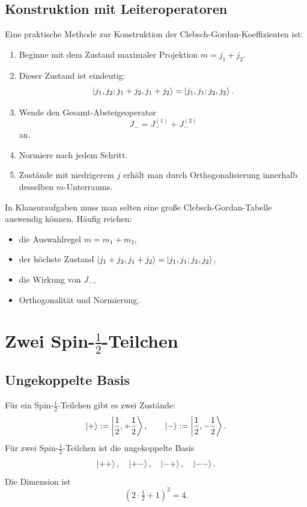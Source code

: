 \subsection{Konstruktion mit Leiteroperatoren}

Eine praktische Methode zur Konstruktion der Clebsch-Gordan-Koeffizienten ist:
\begin{enumerate}
    \item Beginne mit dem Zustand maximaler Projektion \(m=j_1+j_2\).
    \item Dieser Zustand ist eindeutig:
    \[
        \left|j_1,j_2;j_1+j_2,j_1+j_2\right\rangle
        =\left|j_1,j_1;j_2,j_2\right\rangle.
    \]
    \item Wende den Gesamt-Absteigeoperator
    \[
        J_- = J^{(1)}_-+J^{(2)}_-
    \]
    an.
    \item Normiere nach jedem Schritt.
    \item Zustände mit niedrigerem \(j\) erhält man durch Orthogonalisierung innerhalb desselben \(m\)-Unterraums.
\end{enumerate}

\begin{examtipbox}
In Klausuraufgaben muss man selten eine große Clebsch-Gordan-Tabelle auswendig können. Häufig reichen:
\begin{itemize}
    \item die Auswahlregel \(m=m_1+m_2\),
    \item der höchste Zustand \(\left|j_1+j_2,j_1+j_2\right\rangle=\left|j_1,j_1;j_2,j_2\right\rangle\),
    \item die Wirkung von \(J_-\),
    \item Orthogonalität und Normierung.
\end{itemize}
\end{examtipbox}

\section{Zwei Spin-\texorpdfstring{\(\frac12\)}{1/2}-Teilchen}

\subsection{Ungekoppelte Basis}

Für ein Spin-\(\frac12\)-Teilchen gibt es zwei Zustände:
\[
    \left|+\right\rangle:=\left|\frac12,+\frac12\right\rangle,
    \qquad
    \left|-\right\rangle:=\left|\frac12,-\frac12\right\rangle.
\]
Für zwei Spin-\(\frac12\)-Teilchen ist die ungekoppelte Basis
\[
    \left|++\right\rangle,
    \quad
    \left|+-\right\rangle,
    \quad
    \left|-+\right\rangle,
    \quad
    \left|--\right\rangle.
\]
Die Dimension ist
\[
    (2\cdot\tfrac12+1)^2=4.
\]

